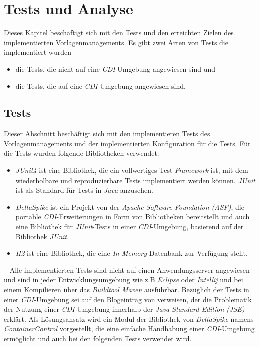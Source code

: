 \chapter{Tests und Analyse}
\label{cha:Analyse}
Dieses Kapitel beschäftigt sich mit den Tests und den erreichten Zielen des implementierten Vorlagenmanagements. Es gibt zwei Arten von Tests die implementiert wurden
\begin{itemize}
	\item die Tests, die nicht auf eine \emph{CDI}-Umgebung angewiesen sind und 
	\item die Tests, die auf eine \emph{CDI}-Umgebung angewiesen sind.
\end{itemize}

\section{Tests}
Dieser Abschnitt beschäftigt sich mit den implementieren Tests des Vorlagenmanagements und der implementierten Konfiguration für die Tests. Für die Tests wurden folgende Bibliotheken verwendet:
\begin{itemize}
	\item\emph{JUnit4}
	\newline
	ist eine Bibliothek, die ein vollwertiges Test-\emph{Framework} ist, mit dem wiederholbare und reproduzierbare Tests implementiert werden können. \emph{JUnit} ist als Standard für Tests in \emph{Java} anzusehen.
	\item\emph{DeltaSpike}
	\newline
	ist ein Projekt von der \emph{Apache-Software-Foundation (ASF)}, die portable \emph{CDI}-Erweiterungen in Form von Bibliotheken bereitstellt und auch eine Bibliothek für \emph{JUnit}-Tests in einer \emph{CDI}-Umgebung, basierend auf der Bibliothek \emph{JUnit}.
	\item\emph{H2}
	\newline
	ist eine Bibliothek, die eine \emph{In-Memory}-Datenbank zur Verfügung stellt.  
\end{itemize}
\ \newline
Alle implementierten Tests sind nicht auf einen Anwendungsserver angewiesen und sind in jeder Entwicklungsumgebung wie z.B \emph{Eclipse} oder \emph{Intellij} und bei einem Kompilieren über das \emph{Buildtool Maven} ausführbar.
\newline
\newline
Bezüglich der Tests in einer \emph{CDI}-Umgebung sei auf den  Blogeintrag von \cite{strubergBlog} verweisen, der die Problematik der Nutzung einer \emph{CDI}-Umgebung innerhalb der \emph{Java-Standard-Edition (JSE)} erklärt. Als Lösungsansatz wird ein Modul der Bibliothek von \emph{DeltaSpike} namens \emph{ContainerControl} vorgestellt, die eine einfache Handhabung einer \emph{CDI}-Umgebung ermöglicht und auch bei den folgenden Tests verwendet wird.
